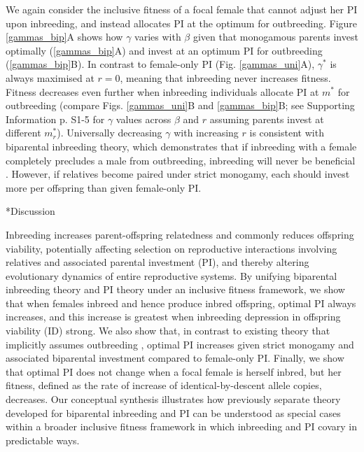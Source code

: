 \documentclass[12pt]{article}
\makeatletter
\renewcommand\section{\@startsection{section}{1}{0in}{-0.5\baselineskip}{0.1\baselineskip}{\normalfont\large\bfseries}}
\makeatother
\begin{document}
We again consider the inclusive fitness of a focal female that cannot adjust her PI upon inbreeding, and instead allocates PI at the optimum for outbreeding. Figure \ref{gammas_bip}A shows how $\gamma$ varies with $\beta$ given that monogamous parents invest optimally (\ref{gammas_bip}A) and invest at an optimum PI for outbreeding (\ref{gammas_bip}B). In contrast to female-only PI (Fig. \ref{gammas_uni}A), $\gamma^{*}$ is always maximised at $r=0$, meaning that inbreeding never increases fitness. Fitness decreases even further when inbreeding individuals allocate PI at $m^{*}$ for outbreeding (compare Figs. \ref{gammas_uni}B and \ref{gammas_bip}B; see Supporting Information p. S1-5 for $\gamma$ values across $\beta$ and $r$ assuming parents invest at different $m^{*}_{r}$). Universally decreasing $\gamma$ with increasing $r$ is consistent with biparental inbreeding theory, which demonstrates that if inbreeding with a female completely precludes a male from outbreeding, inbreeding will never be beneficial \cite[][]{Waser1986, Duthie2015a}. However, if relatives become paired under strict monogamy, each should invest more per offspring than given female-only PI.

\section*{Discussion}

Inbreeding increases parent-offspring relatedness and commonly reduces offspring viability, potentially affecting selection on reproductive interactions involving relatives and associated parental investment (PI), and thereby altering evolutionary dynamics of entire reproductive systems.  By unifying biparental inbreeding theory and PI theory under an inclusive fitness framework, we show that when females inbreed and hence produce inbred offspring, optimal PI always increases, and this increase is greatest when inbreeding depression in offspring viability (ID) strong. We also show that, in contrast to existing theory that implicitly assumes outbreeding \cite[][]{Parker1985}, optimal PI increases given strict monogamy and associated biparental investment compared to female-only PI. Finally, we show that optimal PI does not change when a focal female is herself inbred, but her fitness, defined as the rate of increase of identical-by-descent allele copies, decreases. Our conceptual synthesis illustrates how previously separate theory developed for biparental inbreeding \cite[][]{Parker1979, Parker2006} and PI \cite[][]{Macnair1978, Parker1978} can be understood as special cases within a broader inclusive fitness framework in which inbreeding and PI covary in predictable ways.
\end{document}

